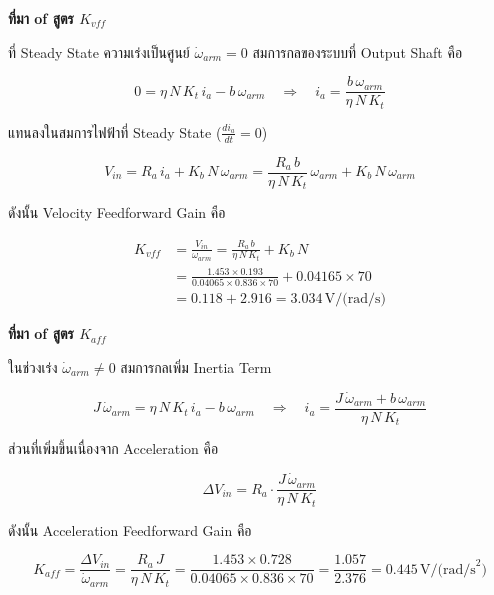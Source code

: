 \textbf{ที่มา of สูตร $K_{vff}$}

ที่ Steady State ความเร่งเป็นศูนย์ $\dot{\omega}_{arm} = 0$
สมการกลของระบบที่ Output Shaft คือ

\begin{equation}
  0 = \eta\, N\, K_t\, i_a - b\,\omega_{arm}
  \quad \Rightarrow \quad
  i_a = \frac{b\,\omega_{arm}}{\eta\, N\, K_t}
  \label{eq:ia_ss}
\end{equation}

แทนลงในสมการไฟฟ้าที่ Steady State ($\frac{di_a}{dt} = 0$)

\begin{equation}
  V_{in} = R_a\, i_a + K_b\, N\,\omega_{arm}
         = \frac{R_a\, b}{\eta\, N\, K_t}\,\omega_{arm} + K_b\, N\,\omega_{arm}
  \label{eq:vin_ss}
\end{equation}

ดังนั้น Velocity Feedforward Gain คือ

\begin{equation}
  \begin{split}
    K_{vff} &= \frac{V_{in}}{\omega_{arm}}
             = \frac{R_a\, b}{\eta\, N\, K_t} + K_b\, N \\
            &= \frac{1.453 \times 0.193}{0.04065 \times 0.836 \times 70}
               + 0.04165 \times 70 \\
            &= 0.118 + 2.916 = 3.034\,\text{V/(rad/s)}
  \end{split}
  \label{eq:Kvff}
\end{equation}

\textbf{ที่มา of สูตร $K_{aff}$}

ในช่วงเร่ง $\dot{\omega}_{arm} \neq 0$ สมการกลเพิ่ม Inertia Term

\begin{equation}
  J\,\dot{\omega}_{arm} = \eta\, N\, K_t\, i_a - b\,\omega_{arm}
  \quad \Rightarrow \quad
  i_a = \frac{J\,\dot{\omega}_{arm} + b\,\omega_{arm}}{\eta\, N\, K_t}
  \label{eq:ia_accel}
\end{equation}

ส่วนที่เพิ่มขึ้นเนื่องจาก Acceleration คือ

\begin{equation}
  \Delta V_{in} = R_a \cdot \frac{J\,\dot{\omega}_{arm}}{\eta\, N\, K_t}
  \label{eq:dvin_accel}
\end{equation}

ดังนั้น Acceleration Feedforward Gain คือ

\begin{equation}
  K_{aff} = \frac{\Delta V_{in}}{\dot{\omega}_{arm}}
           = \frac{R_a\, J}{\eta\, N\, K_t}
           = \frac{1.453 \times 0.728}{0.04065 \times 0.836 \times 70}
           = \frac{1.057}{2.376} = 0.445\,\text{V/(rad/s}^2\text{)}
  \label{eq:Kaff}
\end{equation}

